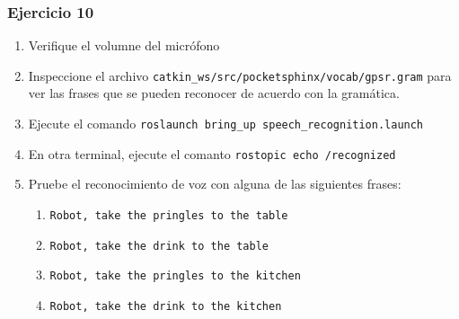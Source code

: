 \begin{frame}\frametitle{Ejercicio 10}
  \begin{enumerate}
  \item Verifique el volumne del micrófono
  \item Inspeccione el archivo \texttt{catkin\_ws/src/pocketsphinx/vocab/gpsr.gram} para ver las frases que se pueden reconocer de acuerdo con la gramática.
  \item Ejecute el comando \texttt{roslaunch bring\_up speech\_recognition.launch}
  \item En otra terminal, ejecute el comanto \texttt{rostopic echo /recognized}
  \item Pruebe el reconocimiento de voz con alguna de las siguientes frases:
    \begin{enumerate}
    \item \texttt{Robot, take the pringles to the table}
    \item \texttt{Robot, take the drink to the table}
    \item \texttt{Robot, take the pringles to the kitchen}
    \item \texttt{Robot, take the drink to the kitchen}
    \end{enumerate}
  \end{enumerate}
\end{frame}
